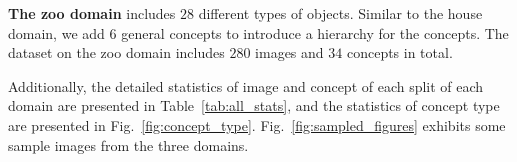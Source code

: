 \noindent\textbf{The zoo domain} includes $28$ different types of objects. 
Similar to the house domain, we add $6$ general concepts to introduce a hierarchy for the concepts.
The dataset on the zoo domain includes $280$ images and $34$ concepts in total.

Additionally, the detailed statistics of image and concept of each split of each domain are presented in Table~\ref{tab:all_stats}, and the statistics of concept type are presented in Fig.~\ref{fig:concept_type}. Fig.~\ref{fig:sampled_figures} exhibits some sample images from the three domains.
